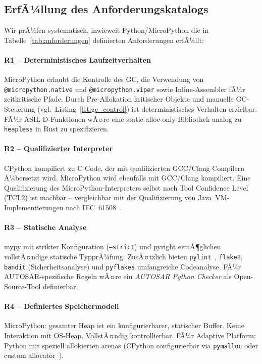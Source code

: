 ﻿\documentclass[12pt,a4paper,twoside]{article}
\begin{document}
\subsection{ErfÃ¼llung des Anforderungskatalogs}
\label{subsec:anforderungen_erfuellung}

Wir prÃ¼fen systematisch, inwieweit Python/MicroPython die in
Tabelle~\ref{tab:anforderungen} definierten Anforderungen erfÃ¼llt:

\paragraph{R1 -- Deterministisches Laufzeitverhalten}
MicroPython erlaubt die Kontrolle des GC, die Verwendung von
\texttt{@micropython.native} und \texttt{@micropython.viper} sowie
Inline-Assembler fÃ¼r zeitkritische Pfade.
Durch Pre-Allokation kritischer Objekte und manuelle GC-Steuerung
(vgl.\ Listing~\ref{lst:gc_control}) ist deterministisches Verhalten
erzielbar. FÃ¼r ASIL-D-Funktionen wÃ¤re eine static-alloc-only-Bibliothek
analog zu \texttt{heapless} in Rust zu spezifizieren.

\paragraph{R2 -- Qualifizierter Interpreter}
CPython kompiliert zu C-Code, der mit qualifizierten GCC/Clang-Compilern
Ã¼bersetzt wird. MicroPython wird ebenfalls mit GCC/Clang kompiliert.
Eine Qualifizierung des MicroPython-Interpreters selbst nach
Tool Confidence Level (TCL2) ist machbar -- vergleichbar mit
der Qualifizierung von Java~VM-Implementierungen nach IEC~61508~\cite{jvm_qualification2018}.

\paragraph{R3 -- Statische Analyse}
mypy mit strikter Konfiguration (\texttt{--strict}) und pyright
ermÃ¶glichen vollstÃ¤ndige statische TypprÃ¼fung. ZusÃ¤tzlich bieten
\texttt{pylint}~\cite{pylint2023}, \texttt{flake8}, \texttt{bandit}
(Sicherheitsanalyse) und \texttt{pyflakes} umfangreiche Codeanalyse.
FÃ¼r AUTOSAR-spezifische Regeln wÃ¤re ein \emph{AUTOSAR Python Checker}
als Open-Source-Tool definierbar.

\paragraph{R4 -- Definiertes Speichermodell}
MicroPython: gesamter Heap ist ein konfigurierbarer, statischer Buffer.
Keine Interaktion mit OS-Heap. VollstÃ¤ndig kontrollierbar.
FÃ¼r Adaptive Platform: Python mit speziell allokierten arenas
(CPython configurierbar via \texttt{pymalloc} oder
custom allocator~\cite{cpython_allocator2022}).
\end{document}
